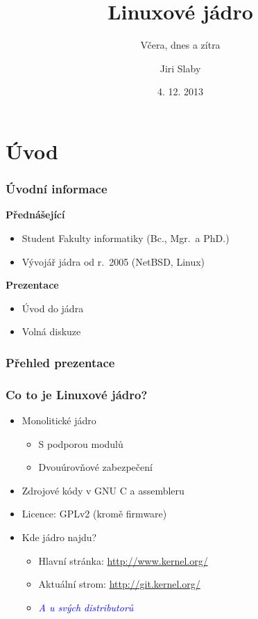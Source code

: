 \documentclass[xcolor=dvipsnames,handout]{beamer}
\title{Linuxové jádro}
\subtitle{Včera, dnes a zítra}
\date{4. 12. 2013}
\author{Jiri Slaby}
\institute[ITI, FI]{ITI, Fakulta informatiky}
\let\Oldemph\emph
\renewcommand{\emph}[1]{\textcolor{blue}{\Oldemph{#1}}}
\newcommand{\heading}[1]{\textbf{\textcolor{BurntOrange}{#1}}}
\begin{document}
\begin{frame}
  \titlepage
\end{frame}

\section{Úvod}

\begin{frame}
  \frametitle{Úvodní informace}

  \heading{Přednášející}
  \begin{itemize}
    \item Student Fakulty informatiky (Bc., Mgr.\ a PhD.)
    \item Vývojář jádra od r.\ 2005 (NetBSD, Linux)
  \end{itemize}

  \pause
  \bigskip

  \heading{Prezentace}
  \begin{itemize}
    \item Úvod do jádra
    \item Volná diskuze
  \end{itemize}

\end{frame}

\begin{frame}
  \frametitle{Přehled prezentace}

  \tableofcontents
\end{frame}

\begin{frame}
  \frametitle{Co to je Linuxové jádro?}

  \begin{itemize}
    \item Monolitické jádro
    \begin{itemize}
      \item S podporou modulů
      \item Dvouúrovňové zabezpečení
    \end{itemize}

    \pause

    \item Zdrojové kódy v GNU C a assembleru

    \item Licence: GPLv2 (kromě firmware)

    \pause

    \item Kde jádro najdu?
    \begin{itemize}
      \item Hlavní stránka: \url{http://www.kernel.org/}
      \item Aktuální strom: \url{http://git.kernel.org/}
      \item \emph{A u svých distributorů}
    \end{itemize}
  \end{itemize}

\end{frame}
\end{document}
